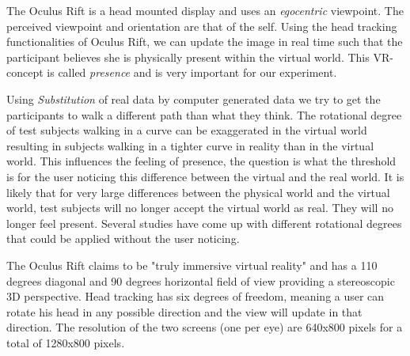 The Oculus Rift is a head mounted display and uses an \textit{egocentric} viewpoint. 
The perceived viewpoint and orientation are that of the self.
Using the head tracking functionalities of Oculus Rift, we can update the image in real time such that the participant believes she is physically present within the virtual world.
This VR-concept is called \textit{presence} and is very important for our experiment.

Using \textit{Substitution} of real data by computer generated data we try to get the participants to walk a different path than what they think. 
The rotational degree of test subjects walking in a curve can be exaggerated in the virtual world resulting in subjects walking in a tighter curve in reality than in the virtual world.
This influences the feeling of presence, the question is what the threshold is for the user noticing this difference between the virtual and the real world. 
It is likely that for very large differences between the physical world and the virtual world, test subjects will no longer accept the virtual world as real.
They will no longer feel present. 
Several studies \cite{steinicke1} \cite{steinicke2} have come up with different rotational degrees that could be applied without the user noticing.

The Oculus Rift claims to be "truly immersive virtual reality" and has a 110 degrees diagonal and 90 degrees horizontal field of view providing a stereoscopic 3D perspective.
Head tracking has six degrees of freedom, meaning a user can rotate his head in any possible direction and the view will update in that direction.
The resolution of the two screens (one per eye) are 640x800 pixels for a total of 1280x800 pixels.
